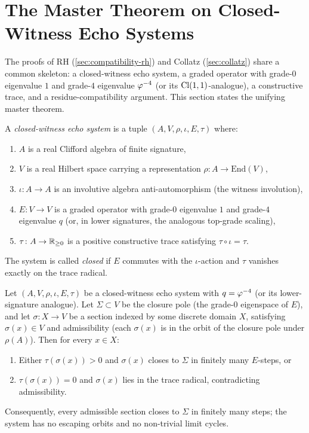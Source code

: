 \section{The Master Theorem on Closed-Witness Echo Systems}
\label{sec:master-theorem}

The proofs of RH (\cref{sec:compatibility-rh}) and Collatz
(\cref{sec:collatz}) share a common skeleton: a closed-witness echo
system, a graded operator with grade-$0$ eigenvalue $1$ and grade-$4$
eigenvalue $\varphi^{-4}$ (or its $\mathrm{Cl}(1,1)$-analogue), a constructive
trace, and a residue-compatibility argument.  This section states
the unifying master theorem.

\begin{definition}
\label{def:closed-witness-system}
A \emph{closed-witness echo system} is a tuple
$(A, V, \rho, \iota, E, \tau)$ where:
\begin{enumerate}[label=\textnormal{(\arabic*)}]
\item $A$ is a real Clifford algebra of finite signature,
\item $V$ is a real Hilbert space carrying a representation
  $\rho \colon A \to \mathrm{End}(V)$,
\item $\iota \colon A \to A$ is an involutive algebra
  anti-automorphism (the witness involution),
\item $E \colon V \to V$ is a graded operator with grade-$0$
  eigenvalue $1$ and grade-$4$ eigenvalue $q$ (or, in lower
  signatures, the analogous top-grade scaling),
\item $\tau \colon A \to \mathbb{R}_{\ge 0}$ is a positive constructive
  trace satisfying $\tau \circ \iota = \tau$.
\end{enumerate}
The system is called \emph{closed} if $E$ commutes with the
$\iota$-action and $\tau$ vanishes exactly on the trace radical.
\end{definition}

\begin{theorem}
\label{thm:witness-return-master}
Let $(A, V, \rho, \iota, E, \tau)$ be a closed-witness echo system
with $q = \varphi^{-4}$ (or its lower-signature analogue).  Let
$\Sigma \subset V$ be the closure pole (the grade-$0$ eigenspace
of $E$), and let $\sigma \colon X \to V$ be a section indexed by
some discrete domain $X$, satisfying $\sigma(x) \in V$ and
admissibility (each $\sigma(x)$ is in the orbit of the closure
pole under $\rho(A)$).
Then for every $x \in X$:
\begin{enumerate}[label=\textnormal{(\arabic*)}]
\item Either $\tau(\sigma(x)) > 0$ and $\sigma(x)$ closes to
  $\Sigma$ in finitely many $E$-steps, or
\item $\tau(\sigma(x)) = 0$ and $\sigma(x)$ lies in the trace
  radical, contradicting admissibility.
\end{enumerate}
Consequently, every admissible section closes to $\Sigma$ in
finitely many steps; the system has no escaping orbits and no
non-trivial limit cycles.
\end{theorem}

